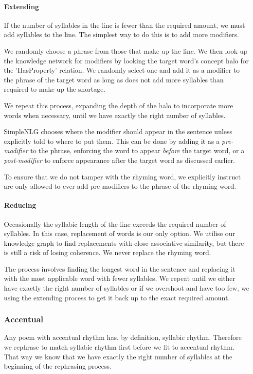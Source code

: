 \paragraph{Extending}
If the number of syllables in the line is fewer than the required amount, we must add syllables to the line. The simplest way to do this is to add more modifiers.

We randomly choose a phrase from those that make up the line. We then look up the knowledge network for modifiers by looking the target word's concept halo for the 'HasProperty' relation. We randomly select one and add it as a modifier to the phrase of the target word as long as does not add more syllables than required to make up the shortage.

We repeat this process, expanding the depth of the halo to incorporate more words when necessary, until we have exactly the right number of syllables.

SimpleNLG chooses where the modifier should appear in the sentence unless explicitly told to where to put them. This can be done by adding it as a \textit{pre-modifier} to the phrase, enforcing the word to appear \textit{before} the target word, or a \textit{post-modifier} to enforce appearance after the target word as discussed earlier.

To ensure that we do not tamper with the rhyming word, we explicitly instruct are only allowed to ever add pre-modifiers to the phrase of the rhyming word.

\paragraph{Reducing}
Occasionally the syllabic length of the line exceeds the required number of syllables. In this case, replacement of words is our only option. We utilise our knowledge graph to find replacements  with close associative similarity, but there is still a risk of losing coherence. We never replace the rhyming word.

The process involves finding the longest word in the sentence and replacing it with the most applicable word with fewer syllables. We repeat until we either have exactly the right number of syllables or if we overshoot and have too few, we using the extending process to get it back up to the exact required amount.

\subsubsection{Accentual}
Any poem with accentual rhythm has, by definition, syllabic rhythm. Therefore we rephrase to match syllabic rhythm first before we fit to accentual rhythm. That way we know that we have exactly the right number of syllables at the beginning of the rephrasing process.

